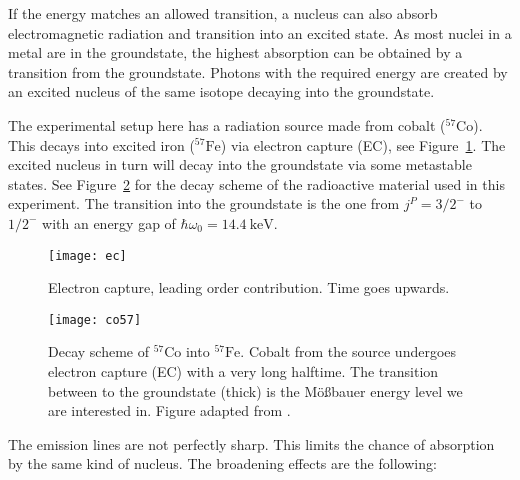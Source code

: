 \documentclass[11pt, english, fleqn, DIV=15, headinclude, BCOR=2cm]{scrreprt}
\begin{document}
If the energy matches an allowed transition, a nucleus can also absorb
electromagnetic radiation and transition into an excited state. As most nuclei
in a metal are in the groundstate, the highest absorption can be obtained by a
transition from the groundstate. Photons with the required energy are created
by an excited nucleus of the same isotope decaying into the groundstate.

The experimental setup here has a radiation source made from cobalt
($^{57}\text{Co}$). This decays into excited iron ($^{57}\text{Fe}$) via
electron capture (EC), see Figure~\ref{fig:ec}. The excited nucleus in turn
will decay into the groundstate via some metastable states. See
Figure~\ref{fig:co57} for the decay scheme of the radioactive material used in
this experiment. The transition into the groundstate is the one from $j^P =
3/2^-$ to $1/2^-$ with an energy gap of $\hbar \omega_0 =
\SI{14.4}{\kilo\electronvolt}$.

\begin{figure}
    \centering
    \texttt{[image: ec]}
    \caption{%
        Electron capture, leading order contribution. Time goes upwards.
    }
    \label{fig:ec}
\end{figure}

\begin{figure}
    \centering
    \texttt{[image: co57]}
    \caption{%
        Decay scheme of $^{57}\mathrm{Co}$ into $^{57}\mathrm{Fe}$. Cobalt from
        the source undergoes electron capture (EC) with a very long halftime.
        The transition between to the groundstate (thick) is the Mößbauer
        energy level we are interested in.
        Figure adapted from
        \textcite[Fig.~4.8]{Schatz/Nukleare_Festkoerperphysik}.
    }
    \label{fig:co57}
\end{figure}

The emission lines are not perfectly sharp. This limits the chance of
absorption by the same kind of nucleus. The broadening effects are the
following:
\end{document}
